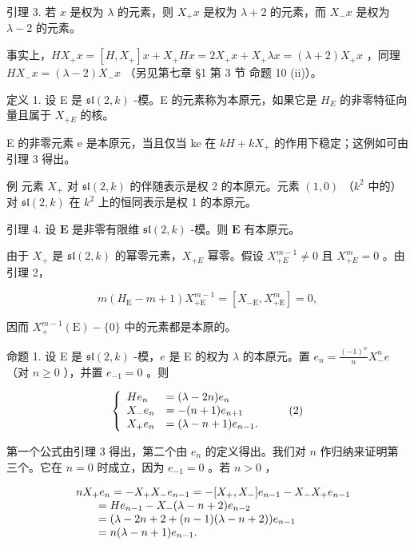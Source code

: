 引理 3. 若 \(x\) 是权为 \(\lambda\) 的元素，则 \(X_{+}x\) 是权为 \(\lambda + 2\) 的元素，而 \(X_{-}x\) 是权为 \(\lambda - 2\) 的元素。

事实上，\(HX_{+}x = [H,X_{+}]x + X_{+}Hx = 2X_{+}x + X_{+}\lambda x = (\lambda +2)X_{+}x\) ，同理 \(HX_{-}x = (\lambda -2)X_{-}x\) （另见第七章 §1 第 3 节 命题 10 (ii)）。

定义 1. 设 E 是 \(\mathfrak{sl}(2,k)\) -模。E 的元素称为本原元，如果它是 \(H_{E}\) 的非零特征向量且属于 \(X_{+E}\) 的核。

E 的非零元素 e 是本原元，当且仅当 ke 在 \(kH + kX_{+}\) 的作用下稳定；这例如可由引理 3 得出。

例 元素 \(X_{+}\) 对 \(\mathfrak{sl}(2,k)\) 的伴随表示是权 2 的本原元。元素 \((1,0)\) （\(k^{2}\) 中的）对 \(\mathfrak{sl}(2,k)\) 在 \(k^{2}\) 上的恒同表示是权 1 的本原元。

引理 4. 设 \(\mathbf{E}\) 是非零有限维 \(\mathfrak{sl}(2,k)\) -模。则 \(\mathbf{E}\) 有本原元。

由于 \(X_{+}\) 是 \(\mathfrak{sl}(2,k)\) 的幂零元素，\(X_{+E}\) 幂零。假设 \(X_{+E}^{m-1} \neq 0\) 且 \(X_{+E}^{m} = 0\) 。由引理 2，

\[
m (H _ {\mathrm{E}} - m + 1) X _ {+ \mathrm{E}} ^ {m - 1} = [ X _ {- \mathrm{E}}, X _ {+ \mathrm{E}} ^ {m} ] = 0,
\]

因而 \(X_{+}^{m - 1}(\mathrm{E}) - \{0\}\) 中的元素都是本原的。

命题 1. 设 E 是 \(\mathfrak{sl}(2,k)\) -模，\(e\) 是 E 的权为 \(\lambda\) 的本原元。置 \(e_n = \frac{(-1)^n}{n} X_-^n e\) （对 \(n \geq 0\) ），并置 \(e_{-1} = 0\) 。则

\[
\left\{ \begin{array}{l l} H e _ {n} & = (\lambda - 2 n) e _ {n} \\ X _ {-} e _ {n} & = - (n + 1) e _ {n + 1} \\ X _ {+} e _ {n} & = (\lambda - n + 1) e _ {n - 1}. \end{array} \right.\tag{2}
\]

第一个公式由引理 3 得出，第二个由 \(e_n\) 的定义得出。我们对 \(n\) 作归纳来证明第三个。它在 \(n = 0\) 时成立，因为 \(e_{-1} = 0\) 。若 \(n > 0\) ，

\[
\begin{array}{r l} & n X _ {+} e _ {n} = - X _ {+} X _ {-} e _ {n - 1} = - [ X _ {+}, X _ {-} ] e _ {n - 1} - X _ {-} X _ {+} e _ {n - 1} \\ & \qquad = H e _ {n - 1} - X _ {-} (\lambda - n + 2) e _ {n - 2} \\ & \qquad = (\lambda - 2 n + 2 + (n - 1) (\lambda - n + 2)) e _ {n - 1} \\ & \qquad = n (\lambda - n + 1) e _ {n - 1}. \end{array}
\]


